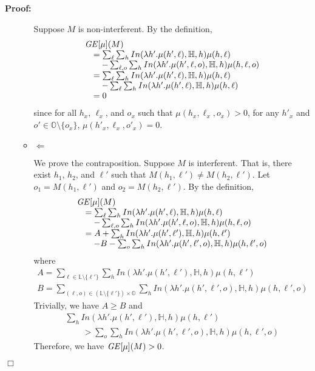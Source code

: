\documentclass{llncs}
\newenvironment{proof}{\noindent\rm{\bf Proof:}}{\hbox{$\Box$}\vspace*{0.2\baselineskip}}
\newcommand{\aset}[1]{\{{#1}\}}
\begin{document}
\begin{proof}
\begin{itemize}
\begin{itemize}
  Suppose $M$ is non-interferent.  By the definition,
\[
\begin{array}{l}
  {\it GE}[\mu](M)\\
  \quad=\sum_\ell\sum_h In(\lambda h'.\mu(h',\ell),\mathbb{H},h)\mu(h,\ell)\\
  \qquad-\sum_{\ell,o}\sum_h In(\lambda h'.\mu(h',\ell,o),\mathbb{H},h)\mu(h,\ell,o)\\
\quad=\sum_\ell\sum_h In(\lambda h'.\mu(h',\ell),\mathbb{H},h)\mu(h,\ell)\\
\qquad-\sum_\ell\sum_h In(\lambda h'.\mu(h',\ell),\mathbb{H},h)\mu(h,\ell)\\
\quad=0
\end{array}
\]
since for all $h_x$, $\ell_x$, and $o_x$ such that
$\mu(h_x,\ell_x,o_x)>0$, for any $h'_x$ and
$o'\in\mathbb{O}\setminus\aset{o_x}$, $\mu(h'_x,\ell_x,o'_x)=0$.
\item $\Leftarrow$

  We prove the contraposition.  Suppose $M$ is interferent.  That is,
  there exist $h_1$, $h_2$, and $\ell'$ such that
  $M(h_1,\ell')\not=M(h_2,\ell')$.  Let $o_1=M(h_1,\ell')$ and
  $o_2=M(h_2,\ell')$.  By the definition,
\[
\begin{array}{l}
  {\it GE}[\mu](M)\\
  \quad=\sum_\ell\sum_h In(\lambda h'.\mu(h',\ell),\mathbb{H},h)\mu(h,\ell)\\
  \qquad-\sum_{\ell,o}\sum_h In(\lambda h'.\mu(h',\ell,o),\mathbb{H},h)\mu(h,\ell,o)\\
\quad=A+\sum_h In(\lambda h'.\mu(h',\ell'),\mathbb{H},h)\mu(h,\ell')\\
\qquad-B-\sum_o\sum_h In(\lambda h'.\mu(h',\ell',o),\mathbb{H},h)\mu(h,\ell',o)
\end{array}
\]
where 
\[
\begin{array}{l}
A=\sum_{\ell\in\mathbb{L}\setminus\aset{\ell'}}\sum_h
In(\lambda h'.\mu(h',\ell'),\mathbb{H},h)\mu(h,\ell')\\
B=\sum_{(\ell,o)\in(\mathbb{L}\setminus\aset{\ell'})\times\mathbb{O}}\sum_h
In(\lambda h'.\mu(h',\ell',o),\mathbb{H},h)\mu(h,\ell',o)
\end{array}
\]
Trivially, we have $A\ge B$ and
\[
\begin{array}{l}
\sum_h In(\lambda h'.\mu(h',\ell'),\mathbb{H},h)\mu(h,\ell')\\
\qquad>\sum_o\sum_h In(\lambda h'.\mu(h',\ell',o),\mathbb{H},h)\mu(h,\ell',o)
\end{array}
\]
Therefore, we have ${\it GE}[\mu](M)>0$.
\end{itemize}


\end{itemize}
\end{proof}
\end{document}
